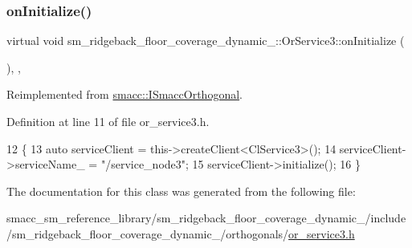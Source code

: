 \subsubsection{\texorpdfstring{on\+Initialize()}{onInitialize()}}
{\footnotesize\ttfamily virtual void sm\+\_\+ridgeback\+\_\+floor\+\_\+coverage\+\_\+dynamic\+\_\+::\+Or\+Service3\+::on\+Initialize (\begin{DoxyParamCaption}{ }\end{DoxyParamCaption})\hspace{0.3cm}{\ttfamily [inline]}, {\ttfamily [override]}, {\ttfamily [virtual]}}



Reimplemented from \hyperlink{classsmacc_1_1ISmaccOrthogonal_a6bb31c620cb64dd7b8417f8705c79c7a}{smacc\+::\+I\+Smacc\+Orthogonal}.



Definition at line 11 of file or\+\_\+service3.\+h.


\begin{DoxyCode}
12     \{
13         \textcolor{keyword}{auto} serviceClient = this->createClient<ClService3>();
14         serviceClient->serviceName\_ = \textcolor{stringliteral}{"/service\_node3"};
15         serviceClient->initialize();
16     \}
\end{DoxyCode}


The documentation for this class was generated from the following file\+:\begin{DoxyCompactItemize}
\item 
smacc\+\_\+sm\+\_\+reference\+\_\+library/sm\+\_\+ridgeback\+\_\+floor\+\_\+coverage\+\_\+dynamic\+\_/include/sm\+\_\+ridgeback\+\_\+floor\+\_\+coverage\+\_\+dynamic\+\_/orthogonals/\hyperlink{sm__ridgeback__floor__coverage__dynamic__1_2include_2sm__ridgeback__floor__coverage__dynamic__1_2orthogonals_2or__service3_8h}{or\+\_\+service3.\+h}\end{DoxyCompactItemize}
